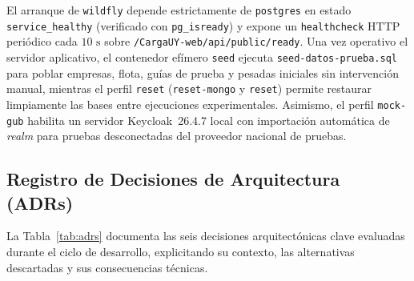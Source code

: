 \documentclass[11pt,a4paper,twocolumn]{article}
\begin{document}
El arranque de \texttt{wildfly} depende estrictamente de \texttt{postgres} en estado \texttt{service\_healthy} (verificado con \texttt{pg\_isready}) y expone un \texttt{healthcheck} HTTP periódico cada $10\text{ s}$ sobre \texttt{/CargaUY-web/api/public/ready}. Una vez operativo el servidor aplicativo, el contenedor efímero \texttt{seed} ejecuta \texttt{seed-datos-prueba.sql} para poblar empresas, flota, guías de prueba y pesadas iniciales sin intervención manual, mientras el perfil \texttt{reset} (\texttt{reset-mongo} y \texttt{reset}) permite restaurar limpiamente las bases entre ejecuciones experimentales. Asimismo, el perfil \texttt{mock-gub} habilita un servidor Keycloak~26.4.7 local con importación automática de \textit{realm} para pruebas desconectadas del proveedor nacional de pruebas.

\subsection{Registro de Decisiones de Arquitectura (ADRs)}

La Tabla~\ref{tab:adrs} documenta las seis decisiones arquitectónicas clave evaluadas durante el ciclo de desarrollo, explicitando su contexto, las alternativas descartadas y sus consecuencias técnicas.
\end{document}
